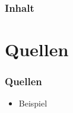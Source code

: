 \documentclass[compress]{beamer}
\title{}
\author{Justus Klameth}
\institute{Joseph-König-Gymnasium}
\begin{document}
    \frame{\titlepage}

    \begin{frame}
        \frametitle{Inhalt}
        \tableofcontents
    \end{frame}

    \section{Quellen}

    \begin{frame}
        \frametitle{Quellen}
        
        \begin{itemize}
            \item Beispiel
        \end{itemize}

    \end{frame}
\end{document}
